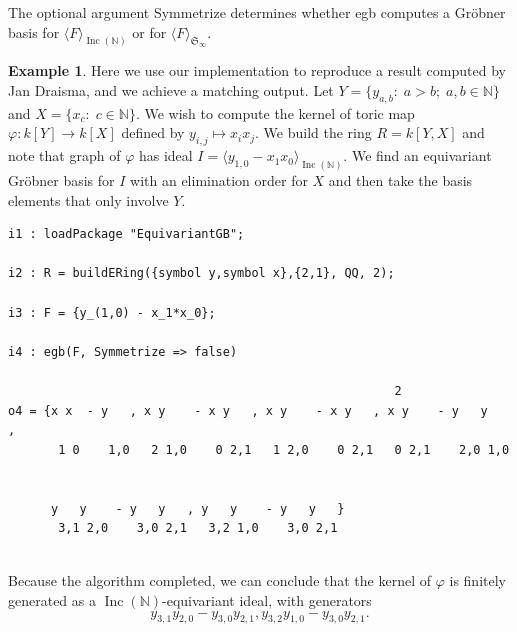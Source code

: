 \documentclass{amsart}
\theoremstyle{definition}
\newtheorem{example}[theorem]{Example}
\theoremstyle{remark}
\numberwithin{equation}{section}
\newenvironment{Macaulay2}{ \begin{spacing}{0.4} %
\smallskip } { \smallskip %
\end{spacing} }
\newcommand{\B}[1]{\mathbb #1}
\newcommand{\F}[1]{\mathfrak #1}
\newcommand{\<}{\langle}
\renewcommand{\>}{\rangle}
\newcommand{\ideal}[1]{\langle #1 \rangle}
\newcommand{\Inc}{\operatorname{Inc}(\B N)}
\begin{document}
The optional argument {\ttfamily Symmetrize} determines whether {\ttfamily egb} computes a Gr\"obner basis for $\ideal{F}_{\Inc}$ or for $\ideal{F}_{\F S_\infty}$.

\begin{example}
Here we use our implementation to reproduce a result computed by Jan Draisma, and we achieve a matching output.  Let $Y = \{y_{a,b}:\; a > b;\; a,b \in \B N\}$ and $X = \{x_c:\; c \in \B N\}$.  We wish to compute the kernel of toric map $\varphi:k[Y] \to k[X]$ defined by $y_{i,j} \mapsto x_ix_j$.  We build the ring $R = k[Y,X]$ and note that graph of $\varphi$ has ideal $I = \ideal{y_{1,0} - x_1x_0}_{\Inc}$.  We find an equivariant Gr\"obner basis for $I$ with an elimination order for $X$ and then take the basis elements that only involve $Y$.
 \begin{Macaulay2}
\begin{verbatim}
i1 : loadPackage "EquivariantGB";

i2 : R = buildERing({symbol y,symbol x},{2,1}, QQ, 2);

i3 : F = {y_(1,0) - x_1*x_0};

i4 : egb(F, Symmetrize => false)

                                                      2
o4 = {x x  - y   , x y    - x y   , x y    - x y   , x y    - y   y   ,
       1 0    1,0   2 1,0    0 2,1   1 2,0    0 2,1   0 2,1    2,0 1,0 
       
       
      y   y    - y   y   , y   y    - y   y   }
       3,1 2,0    3,0 2,1   3,2 1,0    3,0 2,1
       
\end{verbatim}
\end{Macaulay2}
Because the algorithm completed, we can conclude that the kernel of $\varphi$ is finitely generated as a $\Inc$-equivariant ideal, with generators 
\[ y_{3,1}y_{2,0} - y_{3,0}y_{2,1}, y_{3,2}y_{1,0} - y_{3,0}y_{2,1}. \]
\end{example}
\end{document}
